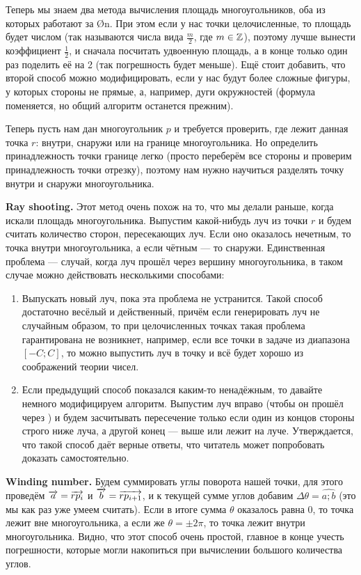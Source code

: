 Теперь мы знаем два метода вычисления площадь многоугольников, оба из которых работают за \O{n}. При этом если у нас точки целочисленные, то площадь будет  числом (так называются числа вида $\frac{m}{2}$, где $m \in \mathbb{Z}$), поэтому лучше вынести коэффициент $\frac{1}{2}$, и сначала посчитать удвоенную площадь, а в конце только один раз поделить её на 2 (так погрешность будет меньше). Ещё стоит добавить, что второй способ можно модифицировать, если у нас будут более сложные фигуры, у которых стороны не прямые, а, например, дуги окружностей (формула поменяется, но общий алгоритм останется прежним).


Теперь пусть нам дан многоугольник $p$ и требуется проверить, где лежит данная точка $r$: внутри, снаружи или на границе многоугольника. Но определить принадлежность точки границе легко (просто переберём все стороны и проверим принадлежность точки отрезку), поэтому нам нужно научиться разделять точку внутри и снаружи многоугольника.

\textbf{Ray shooting.} Этот метод очень похож на то, что мы делали раньше, когда искали площадь многоугольника. Выпустим какой-нибудь луч из точки $r$ и будем считать количество сторон, пересекающих луч. Если оно оказалось нечетным, то точка внутри многоугольника, а если чётным — то снаружи. Единственная проблема — случай, когда луч прошёл через вершину многоугольника, в таком случае можно действовать несколькими способами:

\begin{enumerate}
    \item Выпускать новый луч, пока эта проблема не устранится. Такой способ достаточно весёлый и действенный, причём если генерировать луч не случайным образом, то при целочисленных точках такая проблема гарантирована не возникнет, например, если все точки в задаче из диапазона $[-C; C]$, то можно выпустить луч в точку  и всё будет хорошо из соображений теории чисел.
    \item Если предыдущий способ показался каким-то ненадёжным, то давайте немного модифицируем алгоритм. Выпустим луч вправо (чтобы он прошёл через ) и будем засчитывать пересечение только если один из концов стороны строго ниже луча, а другой конец — выше или лежит на луче. Утверждается, что такой способ даёт верные ответы, что читатель может попробовать доказать самостоятельно.
\end{enumerate}

\textbf{Winding number.} Будем суммировать углы поворота нашей точки, для этого проведём $\overrightarrow{a} = \overrightarrow{rp_i}$ и $\overrightarrow{b} = \overrightarrow{rp_{i + 1}}$, и к текущей сумме углов добавим $\Delta \theta = \widehat{a;b}$ (это мы как раз уже умеем считать). Если в итоге сумма $\theta$ оказалось равна 0, то точка лежит вне многоугольника, а если же $\theta = \pm 2\pi$, то точка лежит внутри многоугольника. Видно, что этот способ очень простой, главное в конце учесть погрешности, которые могли накопиться при вычислении большого количества углов.


